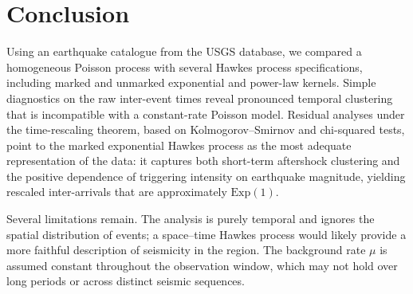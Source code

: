 \section{Conclusion}

Using an earthquake catalogue from the USGS database, we compared a
homogeneous Poisson process with several Hawkes process specifications,
including marked and unmarked exponential and power-law kernels. Simple
diagnostics on the raw inter-event times reveal pronounced temporal
clustering that is incompatible with a constant-rate Poisson model.
Residual analyses under the time-rescaling theorem, based on
Kolmogorov--Smirnov and chi-squared tests, point to the marked
exponential Hawkes process as the most adequate representation of the
data: it captures both short-term aftershock clustering and the positive
dependence of triggering intensity on earthquake magnitude, yielding
rescaled inter-arrivals that are approximately $\mathrm{Exp}(1)$.

Several limitations remain. The analysis is purely temporal and ignores
the spatial distribution of events; a space--time Hawkes process would
likely provide a more faithful description of seismicity in the region.
The background rate $\mu$ is assumed constant throughout the observation
window, which may not hold over long periods or across distinct seismic
sequences.

